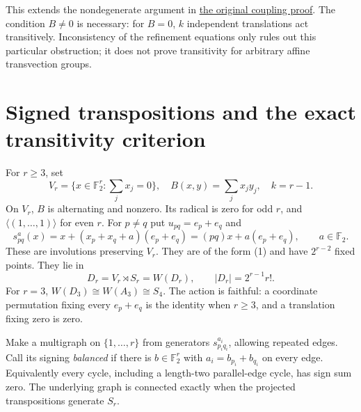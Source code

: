 \documentclass[11pt]{article}
\newcommand{\F}{\mathbb F}
\begin{document}
This extends the nondegenerate argument in
\href{../cross-programme-connections/BREAKTHROUGH_SEARCH_TOPOLOGICAL_COUPLING_2026_11_16.tex}{the original coupling proof}.
The condition $B\ne0$ is necessary: for $B=0$, $k$ independent translations
act transitively. Inconsistency of the refinement equations only rules out
this particular obstruction; it does not prove transitivity for arbitrary
affine transvection groups.

\section{Signed transpositions and the exact transitivity criterion}

For $r\ge3$, set
\[
 V_r=\{x\in\F_2^r:\textstyle\sum_jx_j=0\},\quad
 B(x,y)=\textstyle\sum_jx_jy_j,\quad k=r-1.
\]
On $V_r$, $B$ is alternating and nonzero. Its radical is zero for odd $r$,
and $\langle(1,\ldots,1)\rangle$ for even $r$.
For $p\ne q$ put $u_{pq}=e_p+e_q$ and
\[
 s_{pq}^a(x)=x+(x_p+x_q+a)(e_p+e_q)
            =(pq)x+a(e_p+e_q),\qquad a\in\F_2.          \tag{2}
\]
These are involutions preserving $V_r$. They are of the form (1) and have
$2^{r-2}$ fixed points. They lie in
\[
 D_r=V_r\rtimes S_r=W(D_r),\qquad |D_r|=2^{r-1}r!.
\]
For $r=3$, $W(D_3)\cong W(A_3)\cong S_4$.
The action is faithful: a coordinate permutation fixing every $e_p+e_q$
is the identity when $r\ge3$, and a translation fixing zero is zero.

Make a multigraph on $\{1,\ldots,r\}$ from generators $s_{p_iq_i}^{a_i}$,
allowing repeated edges. Call its signing \emph{balanced} if there is
$b\in\F_2^r$ with $a_i=b_{p_i}+b_{q_i}$ on every edge. Equivalently every
cycle, including a length-two parallel-edge cycle, has sign sum zero.
The underlying graph is connected exactly when the projected transpositions
generate $S_r$.
\end{document}
